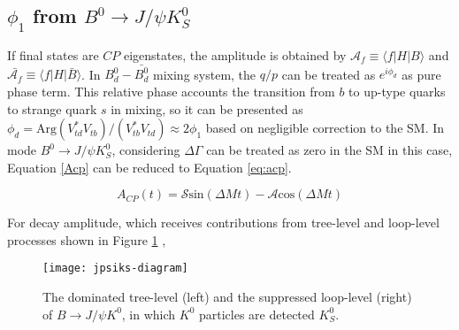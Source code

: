 \subsection{$\phi_1$  from $B^0 \to J/\psi K^0_S$}
If final states are $CP$ eigenstates, the amplitude is obtained by $\mathcal{A}_f \equiv \langle f|H|B\rangle$ and $\bar{\mathcal{A}_f} \equiv \langle f|H|\bar{B}\rangle$. In $B_d^0-\bar{B_d^0}$ mixing system, the $q/p$ can be treated as $e^{i\phi_d}$ as pure phase term. This relative phase accounts the transition from $b$ to up-type quarks to strange quark $s$ in mixing, so it can be presented as $\phi_d = \text{Arg}(V^*_{td}V_{tb})/(V^*_{tb}V_{td}) \approx 2\phi_1 $ based on negligible correction to the SM. In mode $B^0 \to J/\psi K^0_S$, considering $\Delta \Gamma$ can be treated as zero in the SM in this case\cite{dighe2001width}, Equation \ref{Acp} can be reduced to Equation \ref{eq:acp}.

\begin{equation}\label{eq:acp}
	A_{CP}(t)=\mathcal{S} \text{sin}(\Delta{M}t)- \mathcal{A}\text{cos}(\Delta{M}t)
\end{equation}

\begin{comment}
Usually, $S_f$ provides a good sensitivity to $\phi_1$ in Eq(1.42) by replacing $\phi_d$ inside $\lambda_f$ since the rest two equations canceled out the complex phase of $(q/p)$. For instance, in the process of  $b\to \bar{c}cs$ ,the amplitude contributions from tree level and loop level diagram can be written in a form as follows using the CKM unitary condition: 
\end{comment}
For decay amplitude, which receives contributions from tree-level and loop-level processes shown in Figure \ref{fig:jpsiks} , 

\begin{figure}[htpb]
	\centering
	\texttt{[image: jpsiks-diagram]}
	\caption{The dominated tree-level (left) and the suppressed loop-level (right) of $B\to J/\psi K^0$, in which $K^0$ particles are detected $K_S^0$. \cite{wishahi2014measurement}}
	\label{fig:jpsiks}
\end{figure}


